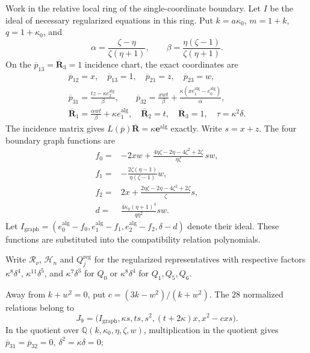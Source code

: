 \documentclass[11pt,a4paper]{article}
\numberwithin{equation}{section}
\theoremstyle{plain}
\theoremstyle{definition}
\theoremstyle{remark}
\begin{document}
Work in the relative local ring of the single-coordinate boundary. Let $I$ be the ideal of necessary regularized equations in this ring. Put $k=a\kappa_0 $, $m=1+k$, $q=1+\kappa_0 $, and
\[
 \alpha=\frac{\zeta -\eta }{\zeta (\eta +1)},\qquad
 \beta=\frac{\eta (\zeta -1)}{\zeta (\eta +1)}.
\]
On the $\overline p_{13}=\overline{\boldsymbol R}_3=1$ incidence chart, the exact coordinates are
\[
\begin{gathered}
 \overline p_{12}=x,\quad \overline p_{13}=1,\quad \overline p_{21}=z,\quad \overline p_{23}=w,\\
 \overline p_{31}=\frac{tz-\kappa e_2^{\mathrm{alg}}}{\beta},\qquad
 \overline p_{32}=\frac{xwt}{\beta}+\frac{\kappa(xe_1^{\mathrm{alg}}-e_0^{\mathrm{alg}})}{\alpha},\\
 \overline{\boldsymbol R}_1=\frac{\alpha w t}{\beta}+\kappa e_1^{\mathrm{alg}},\quad
 \overline{\boldsymbol R}_2=t,\quad \overline{\boldsymbol R}_3=1,\quad \tau=\kappa^2\delta.
\end{gathered}
\]
The incidence matrix gives
$L(\overline p)\overline{\boldsymbol R}=\kappa\boldsymbol e^{\mathrm{alg}}$ exactly. Write $s=x+z$. The four boundary graph functions are
\[
\begin{aligned}
 f_0={}&-2xw+\frac{4\eta \zeta -2\eta -4\zeta ^2+2\zeta }{\eta \zeta }\,sw,\\
 f_1={}&-\frac{2\zeta (\eta -1)}{\eta (\zeta -1)}w,\\
 f_2={}&2x+\frac{2\eta \zeta -2\eta -4\zeta ^2+2\zeta }{\zeta }s,\\
 d={}&\frac{4\kappa_0 (\eta +1)^3}{q\eta ^2}sw.
\end{aligned}
\]
Let $I_{\mathrm{graph}}=(e_0^{\mathrm{alg}}-f_0,e_1^{\mathrm{alg}}-f_1,e_2^{\mathrm{alg}}-f_2,\delta-d)$ denote their
ideal. These functions are substituted into the compatibility relation
polynomials.

Write $\mathcal R_\nu$, $\mathcal H_n$ and $Q_j^{\mathrm{reg}}$ for the
regularized representatives with respective factors
$\kappa^8\delta^4$, $\kappa^{11}\delta^5$, and
$\kappa^7\delta^3$ for $Q_0$ or $\kappa^8\delta^4$
for $Q_1,Q_5,Q_6$.

Away from $k+w^2=0$, put $c=(3k-w^2)/(k+w^2)$. The
$28$ normalized relations belong to
\[
 J_9=\bigl(I_{\mathrm{graph}},\kappa s,ts,s^2,(t+2\kappa)x,x^2-cxs\bigr).
\]
In the quotient over $\mathbb Q(k,\kappa_0 ,\eta ,\zeta ,w)$, multiplication in the quotient gives
$\overline p_{31}=\overline p_{32}=0$, $\delta^2=\kappa\delta=0$; 
\end{document}
